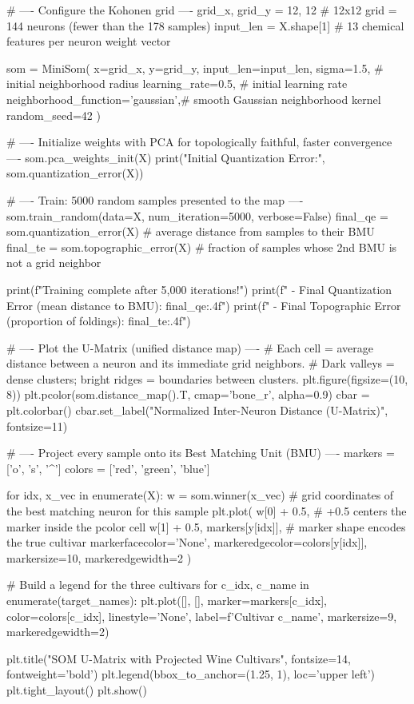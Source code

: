 \begin{codebox}[title={Configure the Kohonen grid}]
# ---- Configure the Kohonen grid ----
grid_x, grid_y = 12, 12  # 12x12 grid = 144 neurons (fewer than the 178 samples)
input_len = X.shape[1]   # 13 chemical features per neuron weight vector

som = MiniSom(
    x=grid_x,
    y=grid_y,
    input_len=input_len,
    sigma=1.5,                       # initial neighborhood radius
    learning_rate=0.5,               # initial learning rate
    neighborhood_function='gaussian',# smooth Gaussian neighborhood kernel
    random_seed=42
)

# ---- Initialize weights with PCA for topologically faithful, faster convergence ----
som.pca_weights_init(X)
print("Initial Quantization Error:", som.quantization_error(X))

# ---- Train: 5000 random samples presented to the map ----
som.train_random(data=X, num_iteration=5000, verbose=False)
final_qe = som.quantization_error(X)   # average distance from samples to their BMU
final_te = som.topographic_error(X)    # fraction of samples whose 2nd BMU is not a grid neighbor

print(f"Training complete after 5,000 iterations!")
print(f" - Final Quantization Error (mean distance to BMU): {final_qe:.4f}")
print(f" - Final Topographic Error (proportion of foldings): {final_te:.4f}")
\end{codebox}

\begin{codebox}[title={Plot the U-Matrix (unified distance map)}]
# ---- Plot the U-Matrix (unified distance map) ----
# Each cell = average distance between a neuron and its immediate grid neighbors.
# Dark valleys = dense clusters; bright ridges = boundaries between clusters.
plt.figure(figsize=(10, 8))
plt.pcolor(som.distance_map().T, cmap='bone_r', alpha=0.9)
cbar = plt.colorbar()
cbar.set_label("Normalized Inter-Neuron Distance (U-Matrix)", fontsize=11)

# ---- Project every sample onto its Best Matching Unit (BMU) ----
markers = ['o', 's', '^']
colors = ['red', 'green', 'blue']

for idx, x_vec in enumerate(X):
    w = som.winner(x_vec)  # grid coordinates of the best matching neuron for this sample
    plt.plot(
        w[0] + 0.5,        # +0.5 centers the marker inside the pcolor cell
        w[1] + 0.5,
        markers[y[idx]],   # marker shape encodes the true cultivar
        markerfacecolor='None',
        markeredgecolor=colors[y[idx]],
        markersize=10,
        markeredgewidth=2
    )

# Build a legend for the three cultivars
for c_idx, c_name in enumerate(target_names):
    plt.plot([], [], marker=markers[c_idx], color=colors[c_idx], linestyle='None',
             label=f'Cultivar {c_name}', markersize=9, markeredgewidth=2)

plt.title("SOM U-Matrix with Projected Wine Cultivars", fontsize=14, fontweight='bold')
plt.legend(bbox_to_anchor=(1.25, 1), loc='upper left')
plt.tight_layout()
plt.show()
\end{codebox}
